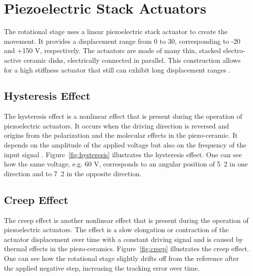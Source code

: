 \section{Piezoelectric Stack Actuators}
The rotational stage uses a linear piezoelectric stack actuator to create the movement. It provides a displacement range from 0 to \unit{30}{\micro\meter}, corresponding to -20 and +150 V, respectively. The actuators are made of many thin, stacked electro-active ceramic disks, electrically connected in parallel. This construction allows for a high stiffness actuator that still can exhibit long displacement ranges \citep{Piezo:2008}.

\subsection{Hysteresis Effect}
The hysteresis effect is a nonlinear effect that is present during the operation of piezoelectric actuators. It occurs when the driving direction is reversed and origins from the polarization and the molecular effects in the piezo-ceramic. It depends on the amplitude of the applied voltage but also on the frequency of the input signal \citep{Qingson:2016}. Figure~\ref{fig:hysteresis} illustrates the hysteresis effect. One can see how the same voltage, e.g. 60 V, corresponds to an angular position of \unit{5.2}{\micro\rad} in one direction and to \unit{7.2}{\micro\rad} in the opposite direction.

\subsection{Creep Effect}
The creep effect is another nonlinear effect that is present during the operation of piezoelectric actuators. The effect is a slow elongation or contraction of the actuator displacement over time with a constant driving signal and is caused by thermal effects in the piezo-ceramics. Figure~\ref{fig:creep} illustrates the creep effect. One can see how the rotational stage slightly drifts off from the reference after the applied negative step, increasing the tracking error over time.

